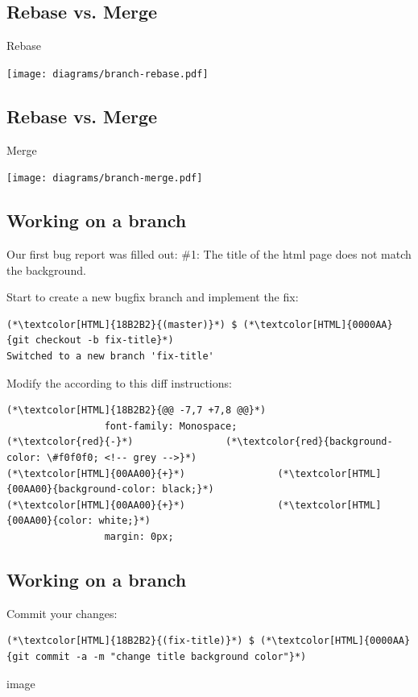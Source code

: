 \subsection{Rebase vs. Merge}
\begin{frame}[fragile]
  \subslidetitle
  Rebase
  \centerline{\texttt{[image: diagrams/branch-rebase.pdf]}}
\end{frame}

\subsection{Rebase vs. Merge}
\begin{frame}[fragile]
  \subslidetitle
  Merge
  \centerline{\texttt{[image: diagrams/branch-merge.pdf]}}
\end{frame}

\subsection{Working on a branch}
\begin{frame}[fragile]
  \subslidetitle

  Our first bug report was filled out:
  \newline \vspace{1em}
  \#1: The title of the html page does not match the background.

  Start to create a new bugfix branch and implement the fix:
  \begin{lstlisting}
(*\textcolor[HTML]{18B2B2}{(master)}*) $ (*\textcolor[HTML]{0000AA}{git checkout -b fix-title}*)
Switched to a new branch 'fix-title'
\end{lstlisting}

  Modify the  according to this diff instructions:
  \begin{lstlisting}
(*\textcolor[HTML]{18B2B2}{@@ -7,7 +7,8 @@}*)
                 font-family: Monospace;
(*\textcolor{red}{-}*)                (*\textcolor{red}{background-color: \#f0f0f0; <!-- grey -->}*)
(*\textcolor[HTML]{00AA00}{+}*)                (*\textcolor[HTML]{00AA00}{background-color: black;}*)
(*\textcolor[HTML]{00AA00}{+}*)                (*\textcolor[HTML]{00AA00}{color: white;}*)
                 margin: 0px;
\end{lstlisting}
\end{frame}

\subsection{Working on a branch}
\begin{frame}[fragile]
  \subslidetitle
  Commit your changes:
  \begin{lstlisting}
(*\textcolor[HTML]{18B2B2}{(fix-title)}*) $ (*\textcolor[HTML]{0000AA}{git commit -a -m "change title background color"}*)
\end{lstlisting}

  image
\end{frame}


